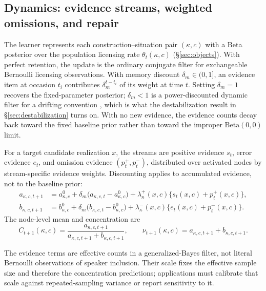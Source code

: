 \documentclass[12pt,letterpaper]{article}
\begin{document}
\subsection{Dynamics: evidence streams, weighted omissions, and repair}
\label{sec:update}

The learner represents each construction--situation pair $(\kappa,c)$ with a
Beta posterior over the population licensing rate $\theta_t(\kappa,c)$
(\S\ref{sec:objects}). With perfect retention, the update is the ordinary
conjugate filter for exchangeable Bernoulli licensing observations. With memory
discount $\delta_m\in(0,1]$, an evidence item at occasion $t_i$ contributes
$\delta_m^{t-t_i}$ of its weight at time $t$. Setting $\delta_m=1$ recovers the
fixed-parameter posterior; $\delta_m<1$ is a power-discounted dynamic filter for
a drifting convention \parencite{WestHarrison1997}, which is what the
destabilization result in \S\ref{sec:destabilization} turns on. With no new
evidence, the evidence counts decay back toward the fixed baseline prior rather
than toward the improper $\mathrm{Beta}(0,0)$ limit.

For a target candidate realization $x$, the streams are positive evidence
$s_t$, error evidence $e_t$, and omission evidence
$(p_t^+,p_t^-)$, distributed over activated nodes by stream-specific evidence
weights. Discounting applies to accumulated evidence, not to the baseline prior:
\begin{align}
a_{\kappa,c,t+1} &= a^0_{\kappa,c}
  +\delta_m\bigl(a_{\kappa,c,t}-a^0_{\kappa,c}\bigr)
  +\lambda^+_\kappa(x,c)\bigl\{s_t(x,c)+p_t^+(x,c)\bigr\},\\
b_{\kappa,c,t+1} &= b^0_{\kappa,c}
  +\delta_m\bigl(b_{\kappa,c,t}-b^0_{\kappa,c}\bigr)
  +\lambda^-_\kappa(x,c)\bigl\{e_t(x,c)+p_t^-(x,c)\bigr\}.
\end{align}
The node-level mean and concentration are
\begin{equation}\label{eq:beta-update}
C_{t+1}(\kappa,c)=
\frac{a_{\kappa,c,t+1}}{a_{\kappa,c,t+1}+b_{\kappa,c,t+1}},
\qquad
\nu_{t+1}(\kappa,c)=a_{\kappa,c,t+1}+b_{\kappa,c,t+1}.
\end{equation}

The evidence terms are effective counts in a generalized-Bayes filter, not
literal Bernoulli observations of speaker inclusion. Their scale fixes the
effective sample size and therefore the concentration predictions; applications
must calibrate that scale against repeated-sampling variance or report
sensitivity to it.
\end{document}
